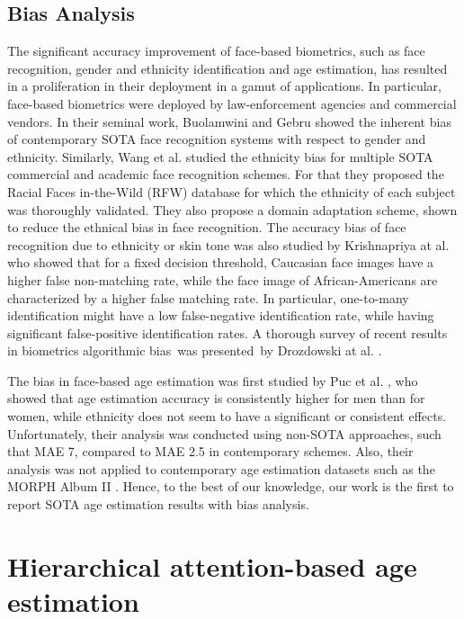 \documentclass[10pt,twocolumn,letterpaper]{article}
\begin{document}
\subsection{Bias Analysis}

\label{subsec:Related bias}

The significant accuracy improvement of face-based biometrics, such as face
recognition, gender and ethnicity identification and age estimation, has
resulted in a proliferation in their deployment in a gamut of applications.
In particular, face-based biometrics were deployed by law-enforcement
agencies and commercial vendors. In their seminal work, Buolamwini and Gebru
\cite{Gebru} showed the inherent bias of contemporary SOTA face recognition
systems with respect to gender and ethnicity. Similarly, Wang et al. \cite {9010843} studied the ethnicity bias for multiple SOTA commercial and
academic face recognition schemes. For that they proposed the Racial Faces
in-the-Wild (RFW) database for which the ethnicity of each subject was
thoroughly validated. They also propose a domain adaptation scheme, shown to
reduce the ethnical bias in face recognition. The accuracy bias of face
recognition due to ethnicity or skin tone was also studied by Krishnapriya
at al. \cite{9001031} who showed that for a fixed decision threshold,
Caucasian face images have a higher false non-matching rate, while the face
image of African-Americans are characterized by a higher false matching
rate. In particular, one-to-many identification might have a low
false-negative identification rate, while having significant false-positive
identification rates. A thorough survey of recent results in biometrics
algorithmic bias\ was presented\ by Drozdowski at al. \cite{9086771}.

The bias in face-based age estimation was first studied by Puc et al. \cite {9287219}, who showed that age estimation accuracy is consistently higher
for men than for women, while ethnicity does not seem to have a significant
or consistent effects. Unfortunately, their analysis was conducted using
non-SOTA approaches, such that MAE 7, compared to MAE
2.5 in contemporary schemes. Also, their analysis was not applied to
contemporary age estimation datasets such as the MORPH Album II \cite {1613043}. Hence, to the best of our knowledge, our work is the first to
report SOTA age estimation results with bias analysis.

\section{Hierarchical attention-based age estimation}
\end{document}
